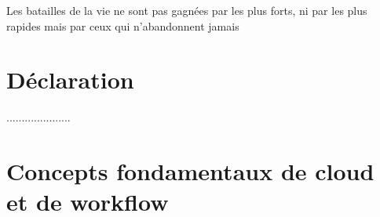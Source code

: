 \documentclass[12pt,twoside]{report}
\author{Zerrouki Djamel}
\theoremstyle{plain}
\theoremstyle{definition}
\theoremstyle{Remarque}
\begin{document}
 
 
 
 
 
 



\clearpage

\printglossary[title=Special Terms, toctitle=List of terms]
 
 
 



 
 
 
Les batailles de la vie ne sont pas gagnées par les plus forts, ni par les plus rapides mais par ceux qui n'abandonnent jamais




  
 
 
 
\chapter*{Déclaration}
.....................





 



\tableofcontents

\listoffigures

\listoftables



 
\chapter{Concepts fondamentaux de cloud et de workflow }


%
\end{document}
